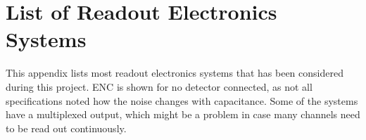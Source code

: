 \documentclass[../main/thesis.tex]{subfiles}
\begin{document}
\chapter{List of Readout Electronics Systems}
\label{a-asics}

This appendix lists most readout electronics systems that has been considered during this project. ENC is shown for no detector connected, as not all specifications noted how the noise changes with capacitance. Some of the systems have a multiplexed output, which might be a problem in case many channels need to be read out continuously. 

\begin{sidewaystable}[h!]
	\begin{center}
		\caption{Readout electronics systems that has been considered for use during this project.}
		\label{tab-asics}
\end{center}
\end{sidewaystable}
\end{document}

